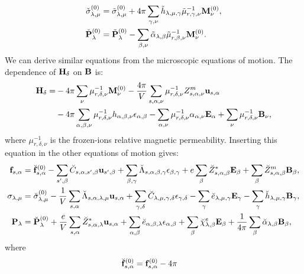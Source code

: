\documentclass[12pt,a4paper]{article}
\begin{document}
{\begin{align}
\check \sigma^{(0)}_{\lambda,\mu} &= \tilde \sigma^{(0)}_{\lambda,\mu}
+ 4 \pi \sum_{\gamma,\nu} \tilde h_{\lambda,\mu,\gamma} 
\tilde \mu^{-1}_{r,\gamma,\nu} {\bf M}^{(0)}_\nu,  \\
\check {\bf P}^{(0)}_{\lambda} &= \tilde {\bf P}^{(0)}_{\lambda}
- \sum_{\beta,\nu} \tilde \alpha_{\lambda,\beta} 
\tilde \mu^{-1}_{r,\beta,\nu} {\bf M}^{(0)}_\nu. 
\end{align}
We can derive similar equations from the microscopic equations of motion.
The dependence of ${\bf H}_\delta$ on ${\bf B}$ is:
\begin{align}
{\bf H}_\delta = 
&- 4 \pi \sum_\nu \mu^{-1}_{r,\delta,\nu} {\bf M}^{(0)}_\nu 
-{4 \pi \over V} \sum_{s,\alpha,\nu} \mu^{-1}_{r,\delta,\nu} Z^m_{s,\alpha,\nu}
{\bf u}_{s,\alpha} \nonumber\\
&- 4 \pi \sum_{\alpha,\beta,\nu} \mu^{-1}_{r,\delta,\nu} h_{\alpha,\beta,\nu}
\epsilon_{\alpha,\beta} - \sum_{\alpha,\nu}
\mu^{-1}_{r,\delta,\nu} \alpha_{\alpha,\nu} {\bf E}_\alpha
+ \sum_\nu \mu^{-1}_{r,\delta,\nu} {\bf B}_\nu, 
\end{align}
where $\mu^{-1}_{r,\delta,\nu}$ is the frozen-ions relative magnetic
permeability.
Inserting this equation in the other equations of motion gives:
\begin{align}
{\bf f}_{s,\alpha}&= \breve{\bf f}^{(0)}_{s,\alpha}
-\sum_{s',\beta} \breve C_{s,\alpha,s',\beta} {\bf u}_{s',\beta}
+\sum_{\beta,\gamma}
\breve \Lambda_{s,\alpha,\beta,\gamma} 
\epsilon_{\beta,\gamma} +
e \sum_{\beta} \breve Z^*_{s,\alpha,\beta} {\bf E}_{\beta}
+\sum_{\beta} 
\breve Z^m_{s,\alpha,\beta} {\bf B}_{\beta}, \\
\sigma_{\lambda,\mu}&= \breve  \sigma_{\lambda,\mu}^{(0)}
-{1\over V} \sum_{s,\alpha}
\breve \Lambda_{s,\alpha,\lambda,\mu} {\bf u}_{s,\alpha}
+\sum_{\gamma,\delta} \breve C_{\lambda,\mu,\gamma,\delta}  
\epsilon_{\gamma,\delta} -
\sum_{\gamma} \breve e_{\lambda,\mu,\gamma} 
 {\bf E}_{\gamma}
-\sum_{\gamma}  \breve h_{\lambda,\mu,\gamma} 
{\bf B}_{\gamma}, \\
{\bf P}_{\lambda}&= \breve {\bf P}^{(0)}_{\lambda}
+{e\over V} \sum_{s,\alpha} \breve Z^*_{s,\alpha,\lambda} 
{\bf u}_{s,\alpha} +
\sum_{\alpha,\beta} \breve e_{\alpha,\beta,\lambda} 
\epsilon_{\alpha,\beta} +
\sum_{\beta} 
\breve \chi^e_{\lambda,\beta}
{\bf E}_{\beta} +
{1\over 4 \pi} \sum_{\beta} \breve \alpha_{\lambda,\beta} 
{\bf B}_{\beta}, 
\end{align}
where
\begin{align}
\breve {\bf f}^{(0)}_{s,\alpha}&= {\bf f}^{(0)}_{s,\alpha} - 4 \pi

\end{align}}
\end{document}
